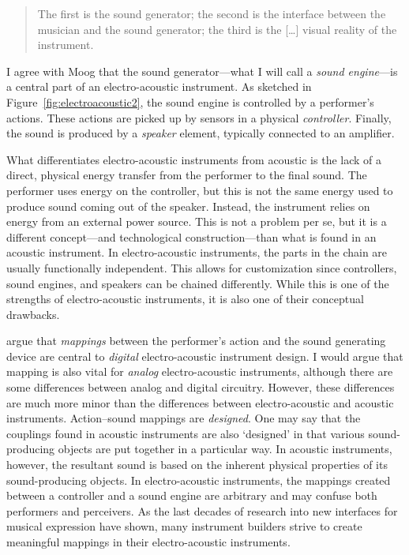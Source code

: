 \begin{quote}
	The first is the sound generator; the second is the interface between the musician and the sound generator; the third is the [\ldots] visual reality of the instrument.
\end{quote}

I agree with Moog that the sound generator---what I will call a \emph{sound engine}---is a central part of an electro-acoustic instrument. As sketched in Figure~\ref{fig:electroacoustic2}, the sound engine is controlled by a performer's actions. These actions are picked up by sensors in a physical \emph{controller}. Finally, the sound is produced by a \emph{speaker} element, typically connected to an amplifier.

What differentiates electro-acoustic instruments from acoustic is the lack of a direct, physical energy transfer from the performer to the final sound. The performer uses energy on the controller, but this is not the same energy used to produce sound coming out of the speaker. Instead, the instrument relies on energy from an external power source. This is not a problem per se, but it is a different concept---and technological construction---than what is found in an acoustic instrument.
In electro-acoustic instruments, the parts in the chain are usually functionally independent. This allows for customization since controllers, sound engines, and speakers can be chained differently. While this is one of the strengths of electro-acoustic instruments, it is also one of their conceptual drawbacks.

\citet[4]{miranda_new_2006} argue that \emph{mappings} between the performer's action and the sound generating device are central to \emph{digital} electro-acoustic instrument design. I would argue that mapping is also vital for \emph{analog} electro-acoustic instruments, although there are some differences between analog and digital circuitry. However, these differences are much more minor than the differences between electro-acoustic and acoustic instruments. Action--sound mappings are \emph{designed}. One may say that the couplings found in acoustic instruments are also `designed' in that various sound-producing objects are put together in a particular way. In acoustic instruments, however, the resultant sound is based on the inherent physical properties of its sound-producing objects. In electro-acoustic instruments, the mappings created between a controller and a sound engine are arbitrary and may confuse both performers and perceivers. As the last decades of research into new interfaces for musical expression have shown, many instrument builders strive to create meaningful mappings in their electro-acoustic instruments.

